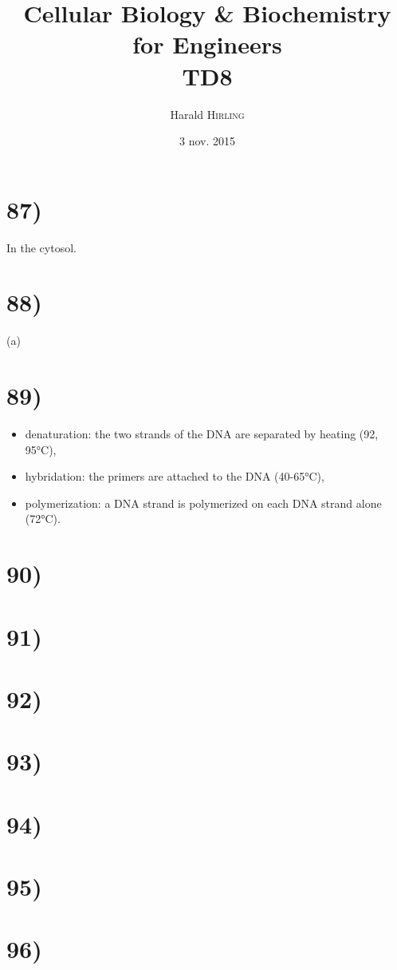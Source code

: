 

\title{Cellular Biology \& Biochemistry for Engineers\\TD8}
\author{Harald \textsc{Hirling}}
\date{3 nov. 2015}


\maketitle

\section*{87)}
In the cytosol.

\section*{88)}
(a)

\section*{89)}
\begin{itemize}
    \item denaturation: the two strands of the DNA are separated by heating (92, 95°C),
    \item hybridation: the primers are attached to the DNA (40-65°C),
    \item polymerization: a DNA strand is polymerized on each DNA strand alone (72°C).
\end{itemize}

\section*{90)}
\section*{91)}
\section*{92)}
\section*{93)}
\section*{94)}
\section*{95)}
\section*{96)}

